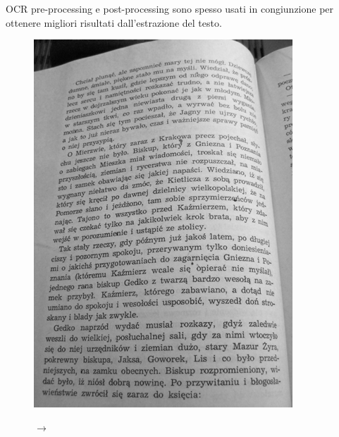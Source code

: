 OCR pre-processing e post-processing sono spesso usati in congiunzione per ottenere migliori risultati dall'estrazione del testo.
\begin{figure}[H]
\centering
{
\begin{minipage}{0.35\textwidth}
\includegraphics[width=\textwidth]{immagini/stato_arte/prep1}
\end{minipage} 
\begin{minipage}{0.06\textwidth}
\centering
\Large$\rightarrow$
\end{minipage}
\begin{minipage}{0.35\textwidth}

\end{minipage}}
\end{figure}
